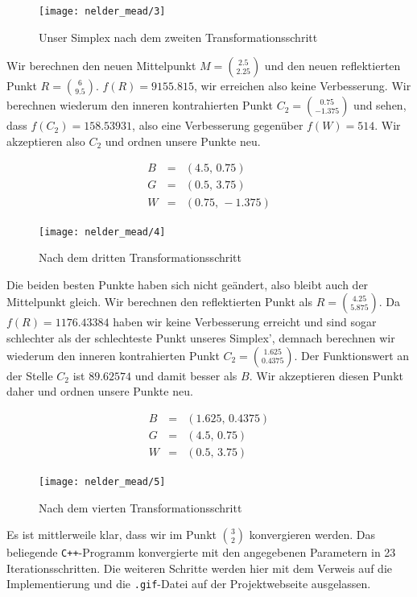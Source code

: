 \documentclass[naustrian]{article}
\begin{document}
{\begin{figure}[h]
    \centering
    \texttt{[image: nelder\_mead/3]}
    \caption{Unser Simplex nach dem zweiten Transformationsschritt}
\end{figure}

Wir berechnen den neuen Mittelpunkt $M = \binom{2.5}{2.25}$ und den neuen
reflektierten Punkt $R = \binom{6}{9.5}$. $f(R) = 9155.815$, wir erreichen also
keine Verbesserung. Wir berechnen wiederum den inneren kontrahierten Punkt
$C_{2} = \binom{0.75}{-1.375}$ und sehen, dass $f(C_{2}) = 158.53931$, also
eine Verbesserung gegenüber $f(W) = 514$. Wir akzeptieren also $C_{2}$ und
ordnen unsere Punkte neu.

\begin{eqnarray*}
    B & = & (4.5, \, 0.75)\\
    G & = & (0.5,\,3.75)\\
    W & = & (0.75,\,-1.375)
\end{eqnarray*}

\begin{figure}[h]
    \centering
    \texttt{[image: nelder\_mead/4]}
    \caption{Nach dem dritten Transformationsschritt}
\end{figure}

Die beiden besten Punkte haben sich nicht geändert, also bleibt auch der
Mittelpunkt gleich. Wir berechnen den reflektierten Punkt als $R =
\binom{4.25}{5.875}$. Da $f(R) = 1176.43384$ haben wir keine Verbesserung
erreicht und sind sogar schlechter als der schlechteste Punkt unseres Simplex',
demnach berechnen wir wiederum den inneren kontrahierten Punkt $C_{2} =
\binom{1.625}{0.4375}$. Der Funktionswert an der Stelle $C_{2}$ ist $89.62574$
und damit besser als $B$. Wir akzeptieren diesen Punkt daher und ordnen unsere
Punkte neu.

\begin{eqnarray*}
    B & = & (1.625,\,0.4375)\\
    G & = & (4.5, \, 0.75)\\
    W & = & (0.5,\,3.75)
\end{eqnarray*}

\begin{figure}[h]
    \centering
    \texttt{[image: nelder\_mead/5]}
    \caption{Nach dem vierten Transformationsschritt}
\end{figure}

Es ist mittlerweile klar, dass wir im Punkt $\binom{3}{2}$ konvergieren werden.
Das beliegende {\tt C++}-Programm konvergierte mit den angegebenen Parametern
in 23 Iterationsschritten. Die weiteren Schritte werden hier mit dem Verweis
auf die Implementierung und die {\tt .gif}-Datei auf der Projektwebseite
ausgelassen.

}
\end{document}
